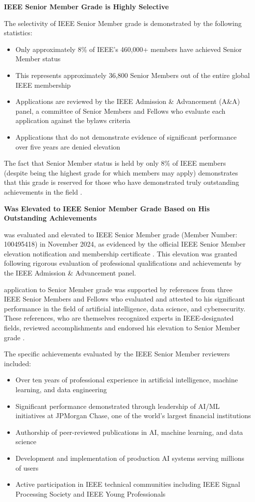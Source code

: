 \textbf{IEEE Senior Member Grade is Highly Selective}

The selectivity of IEEE Senior Member grade is demonstrated by the following statistics:
\begin{itemize}
    \item Only approximately 8\% of IEEE's 460,000+ members have achieved Senior Member status
    \item This represents approximately 36,800 Senior Members out of the entire global IEEE membership
    \item Applications are reviewed by the IEEE Admission \& Advancement (A\&A) panel, a committee of Senior Members and Fellows who evaluate each application against the bylaws criteria
    \item Applications that do not demonstrate evidence of significant performance over five years are denied elevation
\end{itemize}

The fact that Senior Member status is held by only 8\% of IEEE members (despite being the highest grade for which members may apply) demonstrates that this grade is reserved for those who have demonstrated truly outstanding achievements in the field \cite{ieeeseniormemberbylaw}.

\textbf{\dr Was Elevated to IEEE Senior Member Grade Based on His Outstanding Achievements}

\dr was evaluated and elevated to IEEE Senior Member grade (Member Number: 100495418) in November 2024, as evidenced by the official IEEE Senior Member elevation notification and membership certificate \cite{ieeeseniorresults}. This elevation was granted following rigorous evaluation of \drs professional qualifications and achievements by the IEEE Admission \& Advancement panel.

\drs application to Senior Member grade was supported by references from three IEEE Senior Members and Fellows who evaluated and attested to his significant performance in the field of artificial intelligence, data science, and cybersecurity. These references, who are themselves recognized experts in IEEE-designated fields, reviewed \drs accomplishments and endorsed his elevation to Senior Member grade \cite{ieeevouchers}.

The specific achievements evaluated by the IEEE Senior Member reviewers included:
\begin{itemize}
    \item Over ten years of professional experience in artificial intelligence, machine learning, and data engineering
    \item Significant performance demonstrated through leadership of AI/ML initiatives at JPMorgan Chase, one of the world's largest financial institutions
    \item Authorship of peer-reviewed publications in AI, machine learning, and data science
    \item Development and implementation of production AI systems serving millions of users
    \item Active participation in IEEE technical communities including IEEE Signal Processing Society and IEEE Young Professionals
\end{itemize}


